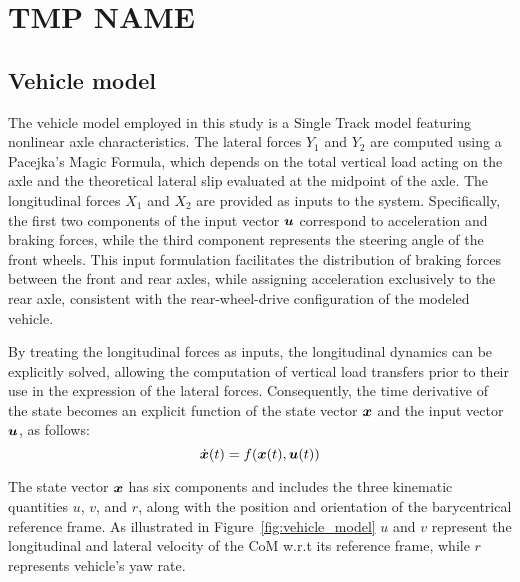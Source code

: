 \section{TMP NAME}
\label{sec:tmp}

\subsection{Vehicle model}
\label{sec:vehicle_model}
The vehicle model employed in this study is a Single Track model featuring nonlinear axle characteristics. The lateral forces $Y_1$ and $Y_2$ are computed using a Pacejka's Magic Formula, which depends on the total vertical load acting on the axle and the theoretical lateral slip evaluated at the midpoint of the axle. 
The longitudinal forces $X_1$ and $X_2$ are provided as inputs to the system. Specifically, the first two components of the input vector $\boldsymbol{u}$ correspond to acceleration and braking forces, while the third component represents the steering angle of the front wheels. This input formulation facilitates the distribution of braking forces between the front and rear axles, while assigning acceleration exclusively to the rear axle, consistent with the rear-wheel-drive configuration of the modeled vehicle. 

By treating the longitudinal forces as inputs, the longitudinal dynamics can be explicitly solved, allowing the computation of vertical load transfers prior to their use in the expression of the lateral forces. Consequently, the time derivative of the state becomes an explicit function of the state vector $\boldsymbol{x}$ and the input vector $\boldsymbol{u}$, as follows:
\begin{equation}
	\dot{\boldsymbol{x}}(t) = f(\boldsymbol{x}(t), \boldsymbol{u}(t))
\end{equation}

The state vector $\boldsymbol{x}$ has six components and includes the three kinematic quantities $u$, $v$, and $r$, along with the position and orientation of the barycentrical reference frame. As illustrated in Figure~\ref{fig:vehicle_model} $u$ and $v$ represent the longitudinal and lateral velocity of the CoM w.r.t its reference frame, while $r$ represents vehicle's yaw rate.

